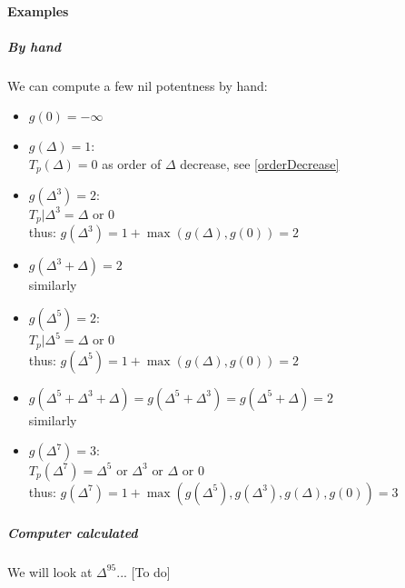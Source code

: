 \paragraph{Examples}
\subparagraph{By hand}
We can compute a few nil potentness by hand:
\begin{itemize}
	\item $g(0) = -\infty$
	
	\item $g(\Delta) = 1$:\\
	$
	T_p(\Delta) = 0
	$
	as order of $\Delta$ decrease, see \ref{orderDecrease}
	
	\item $g(\Delta^3) = 2$:\\
	$
	T_p|\Delta^3 = \Delta \text{ or } 0
	$\\
	thus:
	$
	g(\Delta^3) = 1 + \max(g(\Delta), g(0)) = 2
	$
	
	\item $g(\Delta^3+\Delta) = 2$\\
	similarly
	
	\item $g(\Delta^5) = 2$:\\
	$
	T_p|\Delta^5 = \Delta \text{ or } 0
	$\\
	thus:
	$
	g(\Delta^5) = 1 + \max(g(\Delta), g(0)) = 2
	$
	
	\item $g(\Delta^5+\Delta^3+\Delta) = g(\Delta^5+\Delta^3) = g(\Delta^5+\Delta) = 2$\\
	similarly
	
	\item $g(\Delta^7) = 3$:\\
	$
	T_p(\Delta^7) = \Delta^5 \text{ or } \Delta^3 \text{ or }  \Delta \text{ or } 0
	$\\
	thus:
	$
	g(\Delta^7) = 1 + \max(g(\Delta^5), g(\Delta^3), g(\Delta), g(0)) = 3
	$
\end{itemize}



\subparagraph{Computer calculated}
We will look at $\Delta^{95}$...
[To do]

